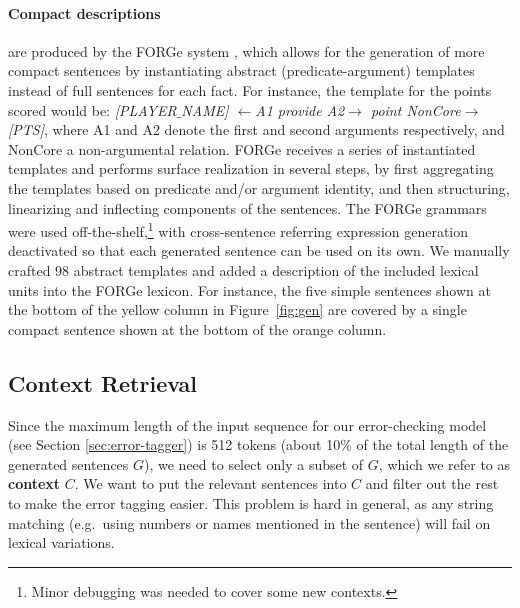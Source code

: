 \paragraph{Compact descriptions} are produced by the FORGe system \cite{mille-etal-2019-teaching}, which allows for the generation of more compact sentences by instantiating abstract (predicate-argument) templates instead of full sentences for each fact. For instance, the template for the points scored would be: \emph{[PLAYER$\_$NAME] $\leftarrow$A1 provide A2$\rightarrow$ point NonCore$\rightarrow$[PTS]}, where A1 and A2 denote the first and second arguments respectively, and NonCore a non-argumental relation. FORGe receives a series of instantiated templates and performs surface realization in several steps, by first aggregating the templates based on predicate and/or argument identity, and then structuring, linearizing and inflecting components of the sentences. The FORGe grammars were
used off-the-shelf,\footnote{Minor debugging was needed to cover some new contexts.} with cross-sentence referring expression generation deactivated so that each generated sentence can be used on its own. We manually crafted 98 abstract templates and added a description of the included lexical units into the FORGe lexicon.
For instance, the five simple sentences shown at the bottom of the yellow column in  Figure~\ref{fig:gen} are covered by a single compact sentence shown at the bottom of the orange column.


\subsection{Context Retrieval}
\label{sec:context-retrieval}
Since the maximum length of the input sequence for our error-checking model (see Section \ref{sec:error-tagger}) is 512 tokens (about 10\% of the total length of the generated sentences $G$), we need to select only a subset of $G$, which we refer to as \textbf{context} $C$. We want to put the relevant sentences into $C$ and filter out the rest to make the error tagging easier. This problem is hard in general, as any string matching (e.g.\ using numbers or names mentioned in the sentence) will fail on lexical variations. %


